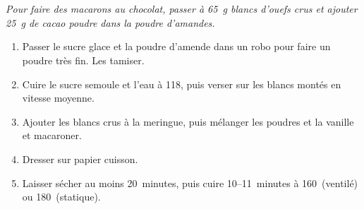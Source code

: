 


\begin{ingredients}
  \\[-2mm]
  \\[-2mm]
\end{ingredients}

{\it Pour faire des macarons au chocolat, passer \`a 65~g blancs
  d'ouefs crus et ajouter 25~g de cacao poudre dans la poudre
  d'amandes.}

\begin{recipe}
  \begin{enumerate}

  \item Passer le sucre glace et la poudre d'amende dans un robo pour
    faire un poudre tr\`es fin.  Les tamiser.

  \item Cuire le sucre semoule et l'eau \`a 118\C, puis verser sur les
    blancs mont\'es en vitesse moyenne.

  \item Ajouter les blancs crus \`a la meringue, puis m\'elanger les
    poudres et la vanille et macaroner.

  \item Dresser sur papier cuisson.

  \item Laisser s\'echer au moins 20~minutes, puis cuire
    10--11~minutes \`a 160\C\ (ventil\'e) ou 180\C\ (statique).
  \end{enumerate}
\end{recipe}



\begin{ingredients}
\end{ingredients}


